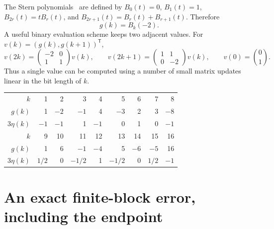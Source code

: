 \documentclass[11pt,a4paper]{article}
\numberwithin{equation}{section}
\theoremstyle{definition}
\theoremstyle{remark}
\begin{document}
The Stern polynomials~\cite{Stern} are defined by $B_0(t)=0$, $B_1(t)=1$,
$B_{2r}(t)=tB_r(t)$, and $B_{2r+1}(t)=B_r(t)+B_{r+1}(t)$. Therefore
\begin{equation}
 g(k)=B_k(-2).
 \label{eq:Stern-identification}
\end{equation}
A useful binary evaluation scheme keeps two adjacent values. For
$v(k)=(g(k),g(k+1))^{\mathsf T}$,
\begin{equation}
 v(2k)=
 \begin{pmatrix}-2&0\\1&1\end{pmatrix}v(k),\qquad
 v(2k+1)=
 \begin{pmatrix}1&1\\0&-2\end{pmatrix}v(k),\qquad
 v(0)=\binom01.
 \label{eq:binary-matrices}
\end{equation}
Thus a single value can be computed using a number of small matrix updates
linear in the bit length of $k$.

\begin{center}\small
\begin{tabular}{@{}r*{8}{r}@{}}
\toprule
$k$ & 1&2&3&4&5&6&7&8\\
$g(k)$ &1&$-2$&$-1$&4&$-3$&2&3&$-8$\\
$3\eta(k)$ &$-1$&$-1$&1&$-1$&0&1&0&$-1$\\
\midrule
$k$ &9&10&11&12&13&14&15&16\\
$g(k)$ &1&6&$-1$&$-4$&5&$-6$&$-5$&16\\
$3\eta(k)$ &$1/2$&0&$-1/2$&1&$-1/2$&0&$1/2$&$-1$\\
\bottomrule
\end{tabular}
\end{center}

\section{An exact finite-block error, including the endpoint}
\label{sec:boundary}
\end{document}
